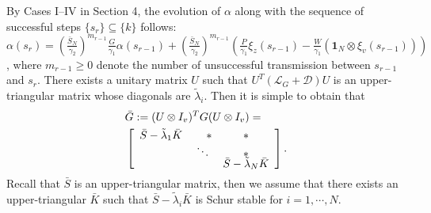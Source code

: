 \documentclass{autart}
\begin{document}
By Cases I--IV in Section 4, the evolution of $\alpha$ along with the sequence of successful steps $\{s_r\} \subseteq \{k\}$ follows: 
$
\alpha(s_{r})
= (\frac{\bar S_N }{\gamma_2})^{m_{r-1}}    \frac{G}{\gamma_1}\alpha(s_{r-1})     + ( \frac{\bar S _ N }{\gamma_2}\! )^{m_{r-1}}   
(\frac{P}{\gamma_1}  \xi_z (s_{r-1})  -   \frac{W}{\gamma_1} (\mathbf 1_N \otimes \xi_v(s_{r-1})) )
$, 
where $m_{r-1} \ge 0$ denote the number of unsuccessful transmission between $s_{r-1}$ and $s_r$.
There exists a unitary matrix $U$ such that 
$
U^T (\mathcal L_G + \mathcal D ) U
$ is an upper-triangular matrix whose diagonals are $\tilde \lambda _ i $. Then it is simple to obtain that
\begin{align}\label{32} 
&\bar G := (U \otimes I _v )^T G (U \otimes I _v ) = \nonumber \\ 
&\left[
\begin{array}{ccc}\renewcommand{\arraystretch}{0.1}
\bar S - \tilde   \lambda_1 \bar K  &\,\,\,\,\,\,\, * &  *   \\
&   \ddots &   *   \\
&   & \bar S - \tilde \lambda_N \bar K 
\end{array}
\right].
\end{align}
Recall that $\bar S$ is an upper-triangular matrix, then we assume that there exists an upper-triangular $\bar K$ such that $\bar S - \tilde \lambda_i \bar K$ is Schur stable for $i=1, \cdots, N$.
\end{document}
